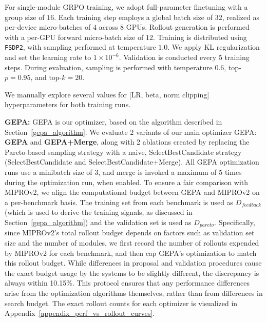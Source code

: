 \documentclass{article} %
\begin{document}
For single-module GRPO training, we adopt full-parameter finetuning with a group size of $16$. Each training step employs a global batch size of $32$, realized as per-device micro-batches of $4$ across $8$ GPUs. Rollout generation is performed with a per-GPU forward micro-batch size of $12$. Training is distributed using \texttt{FSDP2}, with sampling performed at temperature $1.0$. We apply KL regularization and set the learning rate to $1\times 10^{-6}$. Validation is conducted every $5$ training steps. During evaluation, sampling is performed with temperature $0.6$, top-$p=0.95$, and top-$k=20$.

We manually explore several values for [LR, beta, norm clipping] hyperparameters for both training runs.


\textbf{GEPA:} GEPA is our optimizer, based on the algorithm described in Section~\ref{gepa_algorithm}.
We evaluate 2 variants of our main optimizer GEPA: \textbf{GEPA} and \textbf{GEPA+Merge}, along with 2 ablations created by replacing the Pareto-based sampling strategy with a naive, SelectBestCandidate strategy (SelectBestCandidate and SelectBestCandidate+Merge).
All GEPA optimization runs use a minibatch size of 3, and merge is invoked a maximum of 5 times during the optimization run, when enabled. To ensure a fair comparison with MIPROv2, we align the computational budget between GEPA and MIPROv2 on a per-benchmark basis. The training set from each benchmark is used as $D_{feedback}$ (which is used to derive the training signals, as discussed in Section~\ref{gepa_algorithm}) and the validation set is used as $D_{pareto}$. Specifically, since MIPROv2’s total rollout budget depends on factors such as validation set size and the number of modules, we first record the number of rollouts expended by MIPROv2 for each benchmark, and then cap GEPA’s optimization to match this rollout budget. While differences in proposal and validation procedures cause the exact budget usage by the systems to be slightly different, the discrepancy is always within 10.15\%. This protocol ensures that any performance differences arise from the optimization algorithms themselves, rather than from differences in search budget. The exact rollout counts for each optimizer is visualized in Appendix~\ref{appendix_perf_vs_rollout_curves}.
\end{document}
